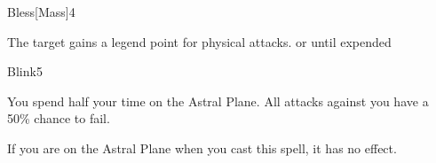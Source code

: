 \begin{spellsection}{Bless}[Mass]{4}
    \begin{spellheader}
    \end{spellheader}
    \begin{spellcontent}
        \begin{spelltargetinginfo}
        \end{spelltargetinginfo}
        \begin{spelleffects}
            \spelleffect The target gains a legend point for physical attacks.
            \spelldur \durshort or until expended
        \end{spelleffects}
    \end{spellcontent}
    \begin{spellfooter}
        \miscastexplode
    \end{spellfooter}
\end{spellsection}

\begin{spellsection}{Blink}{5}
    \begin{spellheader}
    \end{spellheader}
    \begin{spellcontent}
        \begin{spelltargetinginfo}
        \end{spelltargetinginfo}
        \begin{spelleffects}
            \spelleffect You spend half your time on the Astral Plane. All attacks against you have a 50\% chance to fail.
            \spelldur \durshort \dismissable
        \end{spelleffects}
    \end{spellcontent}
    \begin{spellfooter}
        \spellnotes If you are on the Astral Plane when you cast this spell, it has no effect.
        \miscastexplode
    \end{spellfooter}
\end{spellsection}

